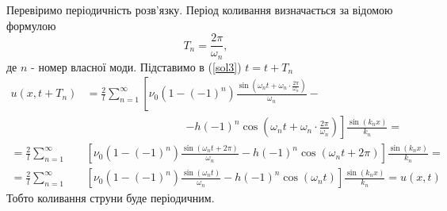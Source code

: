 Перевіримо періодичність розв'язку. Період коливання визначається за відомою формулою \[T_n = \frac{2\pi}{\omega_n},\] де $n$ - номер власної моди. Підставимо в (\ref{sol3}) $t = t + T_n$
\begin{equation*}
    \begin{aligned}
        u(x,t+T_n) & = \frac{2}{l}\sum^{\infty}_{n=1} \left[\nu_0 (1 - (-1)^n)\frac{\sin(\omega_n t + \omega_n \cdot \frac{2\pi}{\omega_n})}{\omega_n} -\right.\\
        &\qquad\qquad\qquad\qquad\quad\left.- h(-1)^n\cos(\omega_n t + \omega_n \cdot \frac{2\pi}{\omega_n})\right] \frac{\sin(k_n x)}{k_n} =\\
        = \frac{2}{l}\sum^{\infty}_{n=1} & \left[\nu_0 (1 - (-1)^n)\frac{\sin(\omega_n t + 2\pi)}{\omega_n} - h(-1)^n\cos(\omega_n t + 2\pi)\right] \frac{\sin(k_n x)}{k_n} =\\ 
        = \frac{2}{l}\sum^{\infty}_{n=1} & \left[\nu_0 (1 - (-1)^n)\frac{\sin(\omega_n t)}{\omega_n} - h(-1)^n\cos(\omega_n t)\right] \frac{\sin(k_n x)}{k_n} = u(x,t)
    \end{aligned}
\end{equation*} 
Тобто коливання струни буде періодичним.